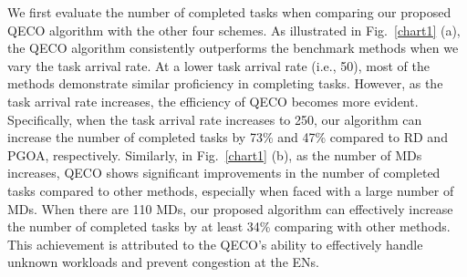 \documentclass[12pt,draftclsnofoot,onecolumn]{IEEEtran}
\begin{document}










We first evaluate the number of completed tasks when comparing our proposed QECO algorithm with the other four schemes. As illustrated in Fig.~\ref{chart1} (a), the QECO algorithm consistently outperforms the benchmark methods when we vary the task arrival rate. At a lower task arrival rate (i.e., 50), most of the methods demonstrate similar proficiency in completing tasks. However, as the task arrival rate increases, the efficiency of QECO becomes more evident. Specifically, when the task arrival rate increases to 250, our algorithm can increase the number of completed tasks by 73\% and 47\% compared to RD and PGOA, respectively.
Similarly, in Fig.~\ref{chart1} (b), as the number of MDs increases, QECO shows significant improvements in the number of completed tasks compared to other methods, especially when faced with a large number of MDs. When there are 110 MDs, our proposed algorithm can effectively increase the number of completed tasks by at least 34\% comparing with other methods. This achievement is attributed to the QECO's ability to effectively handle unknown workloads and prevent congestion at the ENs.
\end{document}
